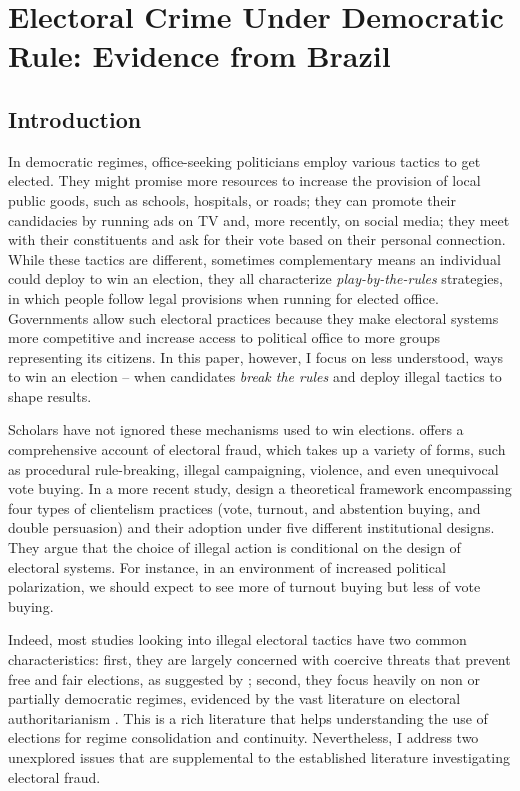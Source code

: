 \documentclass[11pt]{article}
\begin{document}

\section{Electoral Crime Under Democratic Rule: Evidence from Brazil} \label{sec:paper1}

\subsection{Introduction} \label{subsec:introduction_paper1}

In democratic regimes, office-seeking politicians employ various tactics to get elected. They might promise more resources to increase the provision of local public goods, such as schools, hospitals, or roads; they can promote their candidacies by running ads on TV and, more recently, on social media; they meet with their constituents and ask for their vote based on their personal connection. While these tactics are different, sometimes complementary means an individual could deploy to win an election, they all characterize \emph{play-by-the-rules} strategies, in which people follow legal provisions when running for elected office. Governments allow such electoral practices because they make electoral systems more competitive and increase access to political office to more groups representing its citizens. In this paper, however, I focus on less understood, ways to win an election -- when candidates \emph{break the rules} and deploy illegal tactics to shape results.

Scholars have not ignored these mechanisms used to win elections. \citet{LehoucqElectoralFraudCauses2003} offers a comprehensive account of electoral fraud, which takes up a variety of forms, such as procedural rule-breaking, illegal campaigning, violence, and even unequivocal vote buying. In a more recent study, \citet{Gans-MorseVarietiesClientelismMachine2013a} design a theoretical framework encompassing four types of clientelism practices (vote, turnout, and abstention buying, and double persuasion) and their adoption under five different institutional designs. They argue that the choice of illegal action is conditional on the design of electoral systems. For instance, in an environment of increased political polarization, we should expect to see more of turnout buying but less of vote buying.

Indeed, most studies looking into illegal electoral tactics have two common characteristics: first, they are largely concerned with coercive threats that prevent free and fair elections, as suggested by \citet{MaresBuyingExpropriatingStealing2016}; second, they focus heavily on non or partially democratic regimes, evidenced by the vast literature on electoral authoritarianism \citep{LevitskyRiseCompetitiveAuthoritarianism2002,GandhiElectionsAuthoritarianism2009,IchinoDeterringDisplacingElectoral2012,SchedlerElectoralAuthoritarianism2015,AsunkaElectoralFraudViolence2017a}. This is a rich literature that helps understanding the use of elections for regime consolidation and continuity. Nevertheless, I address two unexplored issues that are supplemental to the established literature investigating electoral fraud.
\end{document}
